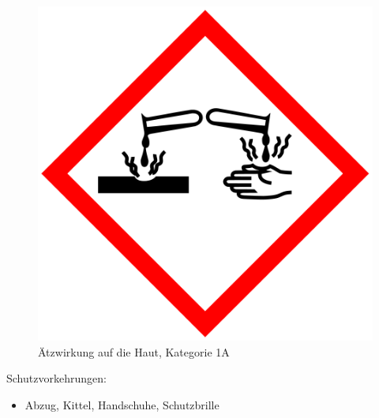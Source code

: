 \begin{figure}[h]
\begin{center}
\begin{minipage}[t]{0.4\textwidth}
\begin{center}
                \includegraphics[height=0.1\textheight]{Bilder/Optische_Datentraeger_Die_Compact_Disc/Material_Polycarbonat/cdaetzwirkung.png}
                \caption[Ätzwirkung auf die Haut, Kategorie 1A \newline \url{https://upload.wikimedia.org/wikipedia/commons/a/a1/GHS-pictogram-acid.svg} (zuletzt aufgerufen am 19.09.2015)]{Ätzwirkung auf die Haut, Kategorie 1A}
                \label{fig:cdaetzwirkung}
            \end{center}
        \end{minipage}
    \end{center}
\end{figure}

Schutzvorkehrungen:
\begin{itemize}
    \item Abzug, Kittel, Handschuhe, Schutzbrille
\end{itemize}

